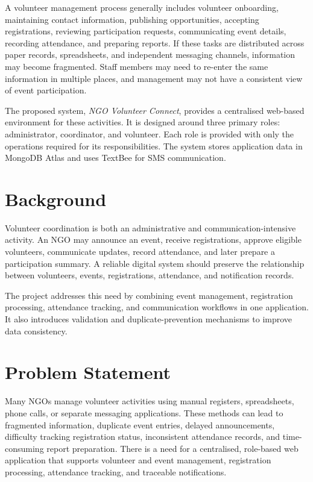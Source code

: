 \documentclass[12pt,a4paper,oneside]{report}
\newcommand{\applicationname}{NGO Volunteer Connect}
\newcommand{\systemname}{\textit{\applicationname}}
\begin{document}
A volunteer management process generally includes volunteer onboarding, maintaining contact information, publishing opportunities, accepting registrations, reviewing participation requests, communicating event details, recording attendance, and preparing reports. If these tasks are distributed across paper records, spreadsheets, and independent messaging channels, information may become fragmented. Staff members may need to re-enter the same information in multiple places, and management may not have a consistent view of event participation.

The proposed system, \systemname, provides a centralised web-based environment for these activities. It is designed around three primary roles: administrator, coordinator, and volunteer. Each role is provided with only the operations required for its responsibilities. The system stores application data in MongoDB Atlas and uses TextBee for SMS communication.

\section{Background}
Volunteer coordination is both an administrative and communication-intensive activity. An NGO may announce an event, receive registrations, approve eligible volunteers, communicate updates, record attendance, and later prepare a participation summary. A reliable digital system should preserve the relationship between volunteers, events, registrations, attendance, and notification records.

The project addresses this need by combining event management, registration processing, attendance tracking, and communication workflows in one application. It also introduces validation and duplicate-prevention mechanisms to improve data consistency.

\section{Problem Statement}
Many NGOs manage volunteer activities using manual registers, spreadsheets, phone calls, or separate messaging applications. These methods can lead to fragmented information, duplicate event entries, delayed announcements, difficulty tracking registration status, inconsistent attendance records, and time-consuming report preparation. There is a need for a centralised, role-based web application that supports volunteer and event management, registration processing, attendance tracking, and traceable notifications.
\end{document}
